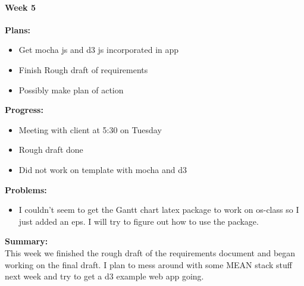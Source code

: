 \paragraph{Week 5}
\begin{adjustwidth}{2.5em}{0pt}
    \vspace{-0.5cm}\textbf{Plans:}
    \vspace{-0.5cm}
    \begin{itemize}
        \item Get mocha js and d3 js incorporated in app
        \item Finish Rough draft of requirements
        \item Possibly make plan of action 
    \end{itemize} 
    \vspace{-0.3cm}\textbf{Progress:}
    \vspace{-0.5cm}
    \begin{itemize}
        \item Meeting with client at 5:30 on Tuesday
        \item Rough draft done
        \item Did not work on template with mocha and d3 
    \end{itemize} 
    \vspace{-0.3cm}\textbf{Problems:}
    \vspace{-0.5cm}
    \begin{itemize}
        \item I couldn't seem to get the Gantt chart latex package to work on os-class so I just added an eps. I will try to figure out how to use the package.
    \end{itemize}  
    \vspace{-0.3cm}\noindent\textbf{Summary:}\\
    \noindent This week we finished the rough draft of the requirements document and began working on the final draft. I plan to mess around with some MEAN stack stuff next week and try to get a d3 example web app going.
\end{adjustwidth} 
